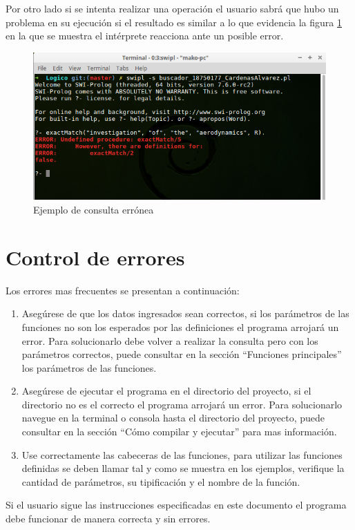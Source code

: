 \documentclass[letterpaper,12pt]{report}
\begin{document}
Por otro lado si se intenta realizar una operación el usuario sabrá que hubo un problema en su ejecución si el resultado es similar a lo que evidencia la figura \ref{fig:fail} en la que se muestra el intérprete reacciona ante un posible error.

\begin{figure}[H]
    \centering
    \includegraphics[width=1\textwidth]{fail.png}
    \caption{Ejemplo de consulta errónea}
    \label{fig:fail}
\end{figure}


\section {Control de errores}

Los errores mas frecuentes se presentan a continuación:

\begin{enumerate}

\item Asegúrese de que los datos ingresados sean correctos, si los parámetros de las funciones no son los esperados por las definiciones el programa arrojará un error. Para solucionarlo debe volver a realizar la consulta pero con los parámetros correctos, puede consultar en la sección ``Funciones principales'' los parámetros de las funciones.

\item Asegúrese de ejecutar el programa en el directorio del proyecto, si el directorio no es el correcto el programa arrojará un error. Para solucionarlo navegue en la terminal o consola hasta el directorio del proyecto, puede consultar en la sección ``Cómo compilar y ejecutar'' para mas información.

\item Use correctamente las cabeceras de las funciones, para utilizar las funciones definidas se deben llamar tal y como se muestra en los ejemplos, verifique la cantidad de parámetros, su tipificación y el nombre de la función.


\end{enumerate}

Si el usuario sigue las instrucciones especificadas en este documento el programa debe funcionar de manera correcta y sin errores.
\end{document}
